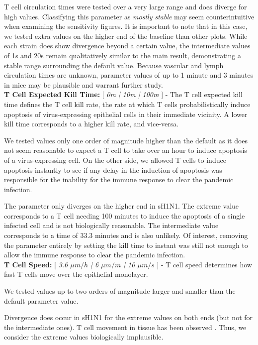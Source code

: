 \documentclass[10pt]{article}
\begin{document}
T cell circulation times were tested over a very large range and does diverge for high values.  Classifying this parameter as \textit{mostly stable} may seem counterintuitive when examining the sensitivity figures.  It is important to note that in this case, we tested extra values on the higher end of the baseline than other plots.  While each strain does show divergence beyond a certain value, the intermediate values of 1s and 20s remain qualitatively similar to the main result, demonstrating a stable range surrounding the default value.  Because vascular and lymph circulation times are unknown, parameter values of up to 1 minute and 3 minutes in mice may be plausible and warrant further study. \\


\textbf{T Cell Expected Kill Time:} [ \textit{0m | 10m | 100m} ]  - The T cell expected kill time defines the T cell kill rate, the rate at which T cells probabilistically induce apoptosis of  virus-expressing epithelial cells in their immediate vicinity.  A lower kill time corresponds to a higher kill rate, and vice-versa.  

We tested values only one order of magnitude higher than the default as it does not seem reasonable to expect a T cell to take over an hour to induce apoptosis of a virus-expressing cell.  On the other side, we allowed T cells to induce apoptosis instantly to see if any delay in the induction of apoptosis was responsible for the inability for the immune response to clear the pandemic infection.

The parameter only diverges on the higher end in sH1N1.  The extreme value corresponds to a T cell needing 100 minutes to induce the apoptosis of a single infected cell and is not biologically reasonable.  The intermediate value corresponds to a time of 33.3 minutes and is also unlikely.  Of interest, removing the parameter entirely by setting the kill time to instant was still not enough to allow the immune response to clear the pandemic infection. \\


\textbf{T Cell Speed:} [ \textit{3.6 $\mu m/h$ | 6 $\mu m/m$ | 10 $\mu m/s$} ] - T cell speed determines how fast T cells move over the epithelial monolayer.

We tested values up to two orders of magnitude larger and smaller than the default parameter value.

Divergence does occur in sH1N1 for the extreme values on both ends (but not for the intermediate ones).  T cell movement in tissue has been observed \cite{Egen2011}.  Thus, we consider the extreme values biologically implausible.  \\
\end{document}
